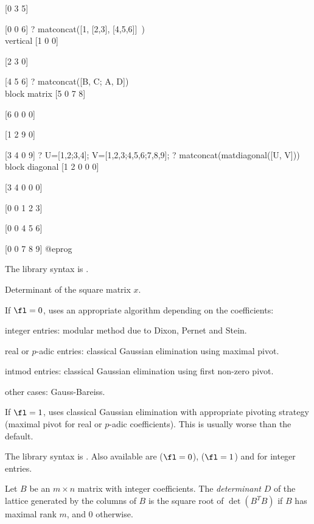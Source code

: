 [0 3 5]

[0 0 6]
? matconcat([1, [2,3], [4,5,6]]~) \\ vertical
[1 0 0]

[2 3 0]

[4 5 6]
? matconcat([B, C; A, D]) \\ block matrix
[5 0 7 8]

[6 0 0 0]

[1 2 9 0]

[3 4 0 9]
? U=[1,2;3,4]; V=[1,2,3;4,5,6;7,8,9];
? matconcat(matdiagonal([U, V])) \\ block diagonal
[1 2 0 0 0]

[3 4 0 0 0]

[0 0 1 2 3]

[0 0 4 5 6]

[0 0 7 8 9]
@eprog

The library syntax is .

\label{se:matdet}
Determinant of the square matrix $x$.

If $\fl=0$, uses an appropriate algorithm depending on the coefficients:

\item integer entries: modular method due to Dixon, Pernet and Stein.

\item real or $p$-adic entries: classical Gaussian elimination using maximal
pivot.

\item intmod entries: classical Gaussian elimination using first non-zero
pivot.

\item other cases: Gauss-Bareiss.

If $\fl=1$, uses classical Gaussian elimination with appropriate pivoting
strategy (maximal pivot for real or $p$-adic coefficients). This is usually
worse than the default.

The library syntax is .
Also available are  ($\fl=0$),
 ($\fl=1$) and  for integer
entries.

\label{se:matdetint}
Let $B$ be an $m\times n$ matrix with integer coefficients. The
\emph{determinant} $D$ of the lattice generated by the columns of $B$ is
the square root of $\det(B^T B)$ if $B$ has maximal rank $m$, and $0$
otherwise.

